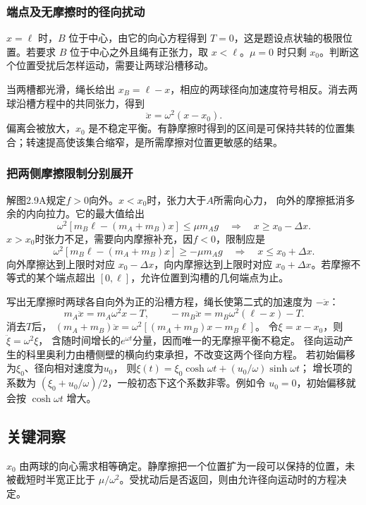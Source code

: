 \documentclass[UTF8,fontset=fandol,a4paper,11pt]{ctexart}
\begin{document}
\subsubsection*{端点及无摩擦时的径向扰动}
$x=\ell$ 时，$B$ 位于中心，由它的向心方程得到 $T=0$，这是题设点状轴的极限位置。若要求 $B$ 位于中心之外且绳有正张力，取 $x<\ell$。$\mu=0$ 时只剩 $x_0$。判断这个位置受扰后怎样运动，需要让两球沿槽移动。

当两槽都光滑，绳长给出 $x_B=\ell-x$，相应的两球径向加速度符号相反。消去两球沿槽方程中的共同张力，得到
\[
\ddot x=\omega^2(x-x_0).
\]
偏离会被放大，$x_0$ 是不稳定平衡。有静摩擦时得到的区间是可保持共转的位置集合；转速提高使该集合缩窄，是所需摩擦对位置更敏感的结果。
\subsubsection*{把两侧摩擦限制分别展开}
解图2.9A规定$f>0$向外。$x<x_0$时，张力大于$A$所需向心力，
向外的摩擦抵消多余的内向拉力。它的最大值给出
\[
\omega^2[m_B\ell-(m_A+m_B)x]\leq\mu m_Ag
\quad\Longrightarrow\quad x\geq x_0-\Delta x.
\]
$x>x_0$时张力不足，需要向内摩擦补充，因$f<0$，限制应是
\[
\omega^2[m_B\ell-(m_A+m_B)x]\geq-\mu m_Ag
\quad\Longrightarrow\quad x\leq x_0+\Delta x.
\]
向外摩擦达到上限时对应 $x_0-\Delta x$，向内摩擦达到上限时对应 $x_0+\Delta x$。若摩擦不等式的某个端点超出 $[0,\ell]$，允许位置到沟槽的几何端点为止。

写出无摩擦时两球各自向外为正的沿槽方程，绳长使第二式的加速度为 $-\ddot x$：
\[
m_A\ddot x=m_A\omega^2x-T,\qquad
-m_B\ddot x=m_B\omega^2(\ell-x)-T.
\]
消去$T$后，
$(m_A+m_B)\ddot x=\omega^2[(m_A+m_B)x-m_B\ell]$。
令$\xi=x-x_0$，则$\ddot\xi=\omega^2\xi$，
含随时间增长的$e^{\omega t}$分量，因而唯一的无摩擦平衡不稳定。
径向运动产生的科里奥利力由槽侧壁的横向约束承担，不改变这两个径向方程。
若初始偏移为$\xi_0$、径向相对速度为$u_0$，
则$\xi(t)=\xi_0\cosh\omega t+(u_0/\omega)\sinh\omega t$；
增长项的系数为 $(\xi_0+u_0/\omega)/2$，一般初态下这个系数非零。例如令 $u_0=0$，初始偏移就会按 $\cosh\omega t$ 增大。




\subsection*{关键洞察}

$x_0$ 由两球的向心需求相等确定。静摩擦把一个位置扩为一段可以保持的位置，未被截短时半宽正比于 $\mu/\omega^2$。受扰动后是否返回，则由允许径向运动时的方程决定。
\end{document}
